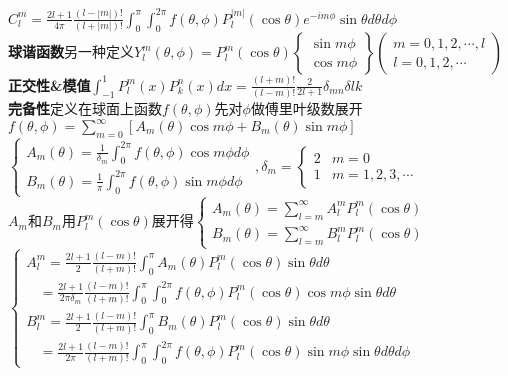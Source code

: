 \documentclass[10pt,a4paper]{article}
\begin{document}
\begin{multicols}{2}
$C_l^m=\frac{2l+1}{4\pi}\frac{(l-|m|)!}{(l+|m|)!}\int_0^{\pi}\int_0^{2\pi}f(\theta,\phi)P_l^{|m|}(\cos\theta)e^{-im\phi}\sin\theta d\theta d\phi$\\
\tiny\textbf{球谐函数}另一种定义$Y_l^m(\theta,\phi)=P_l^m(\cos\theta)\left\{\begin{array}{l}\sin m\phi\\\cos m\phi\end{array}\right\}\left(\begin{array}{l}m=0,1,2,\cdots,l\\l=0,1,2,\cdots\end{array}\right)$\\
\textbf{正交性\&模值}$\int_{-1}^1P_l^m(x)P_k^n(x)dx=\frac{(l+m)!}{(l-m)!}\frac{2}{2l+1}\delta_{mn}\delta{lk}$\\
\textbf{完备性}定义在球面上函数$f(\theta,\phi)$先对$\phi$做傅里叶级数展开\\
\indent$f(\theta,\phi)=\sum_{m=0}^{\infty}[A_m(\theta)\cos m\phi+B_m(\theta)\sin m\phi]$\\
$\left\{\begin{array}{l}A_m(\theta)=\frac{1}{\delta_m}\int_0^{2\pi}f(\theta,\phi)\cos m\phi d\phi\\B_m(\theta)=\frac{1}{\pi}\int_0^{2\pi}f(\theta,\phi)\sin m\phi d\phi\end{array}\right.,\delta_m=\left\{\begin{array}{ll}2&m=0\\1&m=1,2,3,\cdots\end{array}\right.$\\
$A_m$和$B_m$用$P_l^m(\cos\theta)$展开得$\left\{\begin{array}{l}A_m(\theta)=\sum_{l=m}^{\infty}A_l^mP_l^m(\cos\theta)\\B_m(\theta)=\sum_{l=m}^{\infty}B_l^mP_l^m(\cos\theta)\end{array}\right.$\\
$\left\{\begin{array}{l}A_l^m=\frac{2l+1}{2}\frac{(l-m)!}{(l+m)!}\int_0^{\pi}A_m(\theta)P_l^m(\cos\theta)\sin\theta d\theta\\~~~~=\frac{2l+1}{2\pi\delta_m}\frac{(l-m)!}{(l+m)!}\int_0^{\pi}\int_0^{2\pi}f(\theta,\phi)P_l^m(\cos\theta)\cos m\phi\sin\theta d\theta\\B_l^m=\frac{2l+1}{2}\frac{(l-m)!}{(l+m)!}\int_0^{\pi}B_m(\theta)P_l^m(\cos\theta)\sin\theta d\theta\\~~~~=\frac{2l+1}{2\pi}\frac{(l-m)!}{(l+m)!}\int_0^{\pi}\int_0^{2\pi}f(\theta,\phi)P_l^m(\cos\theta)\sin m\phi\sin\theta d\theta d\phi\end{array}\right.$
\end{multicols}
\end{document}
